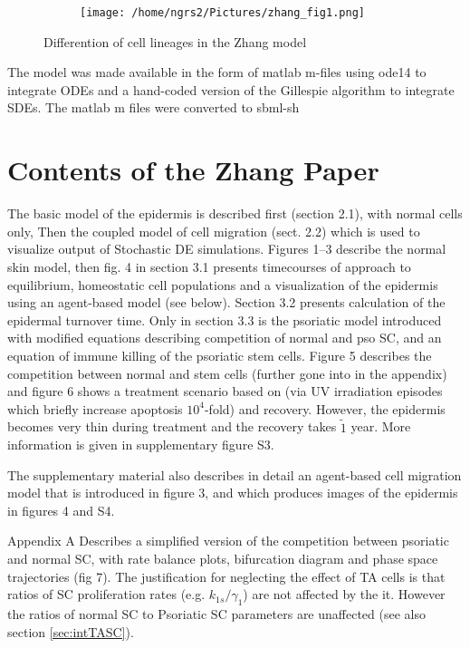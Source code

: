 \documentclass[a4paper,10pt]{report}
\begin{document}
\begin{figure}[h!]
  \begin{subfigure}{.9\textwidth}
    \centering
    \texttt{[image: /home/ngrs2/Pictures/zhang\_fig1.png]}
  \end{subfigure}
  \caption{Differention of cell lineages in the Zhang model}
  \label{fig:zhangfig1diff}
\end{figure}


The model was made available in the form of matlab m-files using ode14 to integrate ODEs and a hand-coded version of the Gillespie algorithm to integrate SDEs. 
The matlab m files were converted to sbml-sh

\section{Contents of the Zhang Paper}

The basic model of the epidermis is described first (section 2.1), with normal cells only, Then the coupled model of cell migration (sect. 2.2) which is 
used to visualize output of Stochastic DE simulations. Figures 1--3 describe the normal skin model, then fig. 4 in section 3.1 presents timecourses of approach to equilibrium, homeostatic cell populations and a visualization of the epidermis using an agent-based model (see below). Section 3.2 presents calculation of the epidermal turnover time.
Only in section 3.3 is the psoriatic model introduced with modified equations
describing competition of normal and pso SC, and an equation of immune killing of the psoriatic stem cells. Figure 5 describes the competition between normal and stem cells (further gone into in the appendix) and figure 6 shows a treatment  scenario based on \cite{weatherhead2011keratinocyte} (via UV irradiation episodes which briefly increase apoptosis $10^4$-fold) and recovery. However, the epidermis becomes very thin during treatment and the recovery takes $\tilde 1$ year. More information is given in supplementary figure S3. 

The supplementary material also describes in detail an agent-based cell migration model that is introduced in figure 3, and which produces images of the epidermis in figures 4 and S4. 

Appendix A Describes a simplified version of the competition between psoriatic and normal
SC, with rate balance plots, bifurcation diagram and phase space trajectories (fig 7). The justification for neglecting the effect of TA cells is that ratios of SC proliferation rates (e.g. $k_{1s}/\gamma_1$) are not affected by the it. However the ratios of normal SC to Psoriatic SC parameters are unaffected (see also section \ref{sec:intTASC}).
\end{document}
